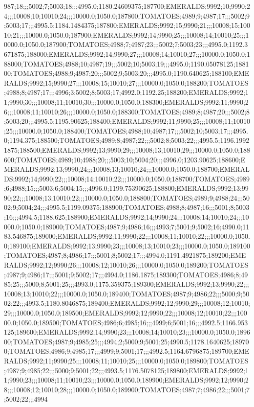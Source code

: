 987;18;;;5002;7;5003;18;;;4995.0;1180.24609375;187700;EMERALDS;9992;10;9990;24;;;10008;10;10010;24;;;10000.0;1050.0;187800;TOMATOES;4989;9;4987;17;;;5002;9;5003;17;;;4995.5;1184.1484375;187800;EMERALDS;9992;15;9990;21;;;10008;15;10010;21;;;10000.0;1050.0;187900;EMERALDS;9992;14;9990;25;;;10008;14;10010;25;;;10000.0;1050.0;187900;TOMATOES;4988;7;4987;23;;;5002;7;5003;23;;;4995.0;1192.3671875;188000;EMERALDS;9992;14;9990;27;;;10008;14;10010;27;;;10000.0;1050.0;188000;TOMATOES;4988;10;4987;19;;;5002;10;5003;19;;;4995.0;1190.05078125;188100;TOMATOES;4988;9;4987;20;;;5002;9;5003;20;;;4995.0;1190.640625;188100;EMERALDS;9992;15;9990;27;;;10008;15;10010;27;;;10000.0;1050.0;188200;TOMATOES;4988;8;4987;17;;;4996;3;5002;8;5003;17;4992.0;1192.25;188200;EMERALDS;9992;11;9990;30;;;10008;11;10010;30;;;10000.0;1050.0;188300;EMERALDS;9992;11;9990;26;;;10008;11;10010;26;;;10000.0;1050.0;188300;TOMATOES;4989;8;4987;20;;;5002;8;5003;20;;;4995.5;1195.90625;188400;EMERALDS;9992;11;9990;25;;;10008;11;10010;25;;;10000.0;1050.0;188400;TOMATOES;4988;10;4987;17;;;5002;10;5003;17;;;4995.0;1194.375;188500;TOMATOES;4989;8;4987;22;;;5002;8;5003;22;;;4995.5;1196.19921875;188500;EMERALDS;9992;13;9990;29;;;10008;13;10010;29;;;10000.0;1050.0;188600;TOMATOES;4989;10;4988;20;;;5003;10;5004;20;;;4996.0;1203.90625;188600;EMERALDS;9992;13;9990;24;;;10008;13;10010;24;;;10000.0;1050.0;188700;EMERALDS;9992;14;9990;22;;;10008;14;10010;22;;;10000.0;1050.0;188700;TOMATOES;4989;6;4988;15;;;5003;6;5004;15;;;4996.0;1199.75390625;188800;EMERALDS;9992;13;9990;22;;;10008;13;10010;22;;;10000.0;1050.0;188800;TOMATOES;4989;9;4988;24;;;5002;9;5004;24;;;4995.5;1199.09375;188900;TOMATOES;4988;8;4987;16;;;5001;8;5003;16;;;4994.5;1188.625;188900;EMERALDS;9992;14;9990;24;;;10008;14;10010;24;;;10000.0;1050.0;189000;TOMATOES;4987;9;4986;16;;;4993;7;5001;9;5002;16;4990.0;1183.546875;189000;EMERALDS;9992;11;9990;22;;;10008;11;10010;22;;;10000.0;1050.0;189100;EMERALDS;9992;13;9990;23;;;10008;13;10010;23;;;10000.0;1050.0;189100;TOMATOES;4987;8;4986;17;;;5001;8;5002;17;;;4994.0;1191.4921875;189200;EMERALDS;9992;12;9990;26;;;10008;12;10010;26;;;10000.0;1050.0;189200;TOMATOES;4987;9;4986;17;;;5001;9;5002;17;;;4994.0;1186.1875;189300;TOMATOES;4986;8;4985;25;;;5000;8;5001;25;;;4993.0;1175.359375;189300;EMERALDS;9992;13;9990;22;;;10008;13;10010;22;;;10000.0;1050.0;189400;TOMATOES;4987;9;4986;22;;;5000;9;5002;22;;;4993.5;1180.8046875;189400;EMERALDS;9992;12;9990;29;;;10008;12;10010;29;;;10000.0;1050.0;189500;EMERALDS;9992;12;9990;22;;;10008;12;10010;22;;;10000.0;1050.0;189500;TOMATOES;4986;6;4985;16;;;4999;6;5001;16;;;4992.5;1166.953125;189600;EMERALDS;9992;14;9990;23;;;10008;14;10010;23;;;10000.0;1050.0;189600;TOMATOES;4987;9;4985;25;;;4994;2;5000;9;5001;25;4990.5;1178.1640625;189700;TOMATOES;4986;9;4985;17;;;4999;9;5001;17;;;4992.5;1164.6796875;189700;EMERALDS;9992;11;9990;25;;;10008;11;10010;25;;;10000.0;1050.0;189800;TOMATOES;4987;9;4985;22;;;5000;9;5001;22;;;4993.5;1176.5078125;189800;EMERALDS;9992;11;9990;23;;;10008;11;10010;23;;;10000.0;1050.0;189900;EMERALDS;9992;12;9990;28;;;10008;12;10010;28;;;10000.0;1050.0;189900;TOMATOES;4987;7;4986;22;;;5001;7;5002;22;;;4994